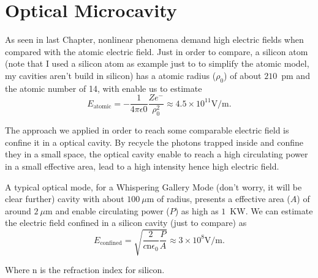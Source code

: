 \chapter{Optical Microcavity}
%
%

As seen in last Chapter, nonlinear phenomena demand high electric fields when compared with the atomic electric field. Just in order to compare, a silicon atom (note that I used a silicon atom as example just to to simplify the atomic model, my cavities aren't build in silicon) has a atomic radius ($\rho_0$) of about $210$~pm and the atomic number of 14, with enable us to estimate   
\begin{equation}
   E_\text{atomic} = -\frac{1}{4 \pi \epsilon0}\frac{Z e^-}{\rho_0^2} %
    \approx 4.5\times10^{11}\text{V/m}.
\end{equation}

The approach we applied in order to reach some comparable electric field is confine it in a optical cavity. By recycle the photons trapped inside and confine they in a small space, the optical cavity enable to reach a high circulating power in a small effective area, lead to a high intensity hence high electric field. 

A typical optical mode, for a Whispering Gallery Mode (don't worry, it will be clear further) cavity with about $100~\mu$m of radius, presents a effective area ($A$) of around $2~\mu$m and enable circulating power ($P$) as high as $1$~KW. We can estimate the electric field confined in a silicon cavity (just to compare) as 
\begin{equation}
    E_\text{confined} = \sqrt{\frac{2}{c\text{n}\epsilon_0}\frac{P}{A}} \approx 3 \times 10^8\text{V/m}.
\end{equation}

Where $\text{n}$ is the refraction index for silicon. 

